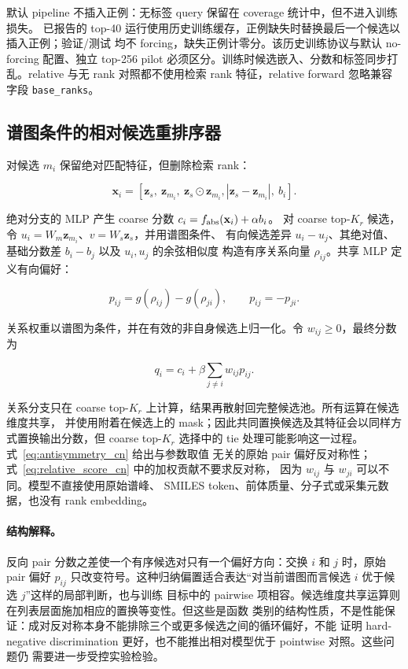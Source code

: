 \documentclass[UTF8,11pt]{ctexart}
\newcommand{\zs}{\mathbf{z}_s}
\begin{document}
默认 pipeline 不插入正例：无标签 query 保留在 coverage 统计中，但不进入训练损失。
已报告的 top-40 运行使用历史训练缓存，正例缺失时替换最后一个候选以插入正例；验证/测试
均不 forcing，缺失正例计零分。该历史训练协议与默认 no-forcing 配置、独立 top-256 pilot
必须区分。训练时候选嵌入、分数和标签同步打乱。relative 与无 rank 对照都不使用检索 rank
特征，relative forward 忽略兼容字段 \texttt{base\_ranks}。

\subsection{谱图条件的相对候选重排序器}

对候选 $m_i$ 保留绝对匹配特征，但删除检索 rank：

\begin{equation}
  \mathbf{x}_i=[\zs,\ \mathbf{z}_{m_i},\ \zs\odot\mathbf{z}_{m_i},
  |\zs-\mathbf{z}_{m_i}|,\ b_i].
  \label{eq:relative_features_cn}
\end{equation}

绝对分支的 MLP 产生 coarse 分数 $c_i=f_{\rm abs}(\mathbf{x}_i)+\alpha b_i$。
对 coarse top-$K_r$ 候选，令 $u_i=W_m\mathbf{z}_{m_i}$、$v=W_s\zs$，并用谱图条件、
有向候选差异 $u_i-u_j$、其绝对值、基础分数差 $b_i-b_j$ 以及 $u_i,u_j$ 的余弦相似度
构造有序关系向量 $\rho_{ij}$。共享 MLP 定义有向偏好：

\begin{equation}
  p_{ij}=g(\rho_{ij})-g(\rho_{ji}),
  \qquad p_{ij}=-p_{ji}.
  \label{eq:antisymmetry_cn}
\end{equation}

关系权重以谱图为条件，并在有效的非自身候选上归一化。令 $w_{ij}\ge0$，最终分数为

\begin{equation}
  q_i=c_i+\beta\sum_{j\ne i}w_{ij}p_{ij}.
  \label{eq:relative_score_cn}
\end{equation}

关系分支只在 coarse top-$K_r$ 上计算，结果再散射回完整候选池。所有运算在候选维度共享，
并使用附着在候选上的 mask；因此共同置换候选及其特征会以同样方式置换输出分数，但 coarse
top-$K_r$ 选择中的 tie 处理可能影响这一过程。式~\ref{eq:antisymmetry_cn} 给出与参数取值
无关的原始 pair 偏好反对称性；式~\ref{eq:relative_score_cn} 中的加权贡献不要求反对称，
因为 $w_{ij}$ 与 $w_{ji}$ 可以不同。模型不直接使用原始谱峰、
SMILES token、前体质量、分子式或采集元数据，也没有 rank embedding。

\paragraph{结构解释。}
反向 pair 分数之差使一个有序候选对只有一个偏好方向：交换 $i$ 和 $j$ 时，原始 pair 偏好
$p_{ij}$ 只改变符号。这种归纳偏置适合表达“对当前谱图而言候选 $i$ 优于候选 $j$”这样的局部判断，也与训练
目标中的 pairwise 项相容。候选维度共享运算则在列表层面施加相应的置换等变性。但这些是函数
类别的结构性质，不是性能保证：成对反对称本身不能排除三个或更多候选之间的循环偏好，不能
证明 hard-negative discrimination 更好，也不能推出相对模型优于 pointwise 对照。这些问题仍
需要进一步受控实验检验。
\end{document}
